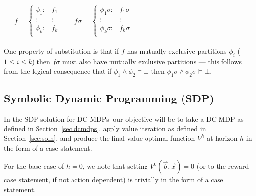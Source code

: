 \documentclass[letterpaper]{article}
\begin{document}
{\footnotesize
\begin{center}
\begin{tabular}{r c c l}
&
\hspace{-6mm} 
  $f = \begin{cases}
    \phi_1: & f_1 \\ 
   \vdots&\vdots\\ 
    \phi_k: & f_k \\ 
  \end{cases}$
&

&
\hspace{-2mm}
  $f\sigma = \begin{cases}
    \phi_1\sigma: & f_1\sigma \\ 
   \vdots&\vdots\\ 
    \phi_k\sigma: & f_k\sigma \\ 
  \end{cases}$
\end{tabular}
\end{center}
}
\normalsize

One property of substitution is that
if $f$ has mutually exclusive partitions $\phi_i$ ($1 \leq i \leq k$)
then $f\sigma$ must also have mutually exclusive partitions ---
this follows from the logical consequence that 
if $\phi_1 \land \phi_2 \models \bot$
then $\phi_1\sigma \land \phi_2\sigma \models \bot$.



\subsection{Symbolic Dynamic Programming (SDP)}


In the SDP solution for DC-MDPs, our objective will be to take
a DC-MDP as defined in Section~\ref{sec:dcmdps}, apply value
iteration as defined in Section~\ref{sec:soln}, and produce
the final value optimal function $V^h$ at horizon $h$ in the form
of a case statement.

For the base case of $h=0$, we note that setting $V^0(\vec{b},\vec{x}) = 0$
(or to the reward case statement, if not action dependent)
is trivially in the form of a case statement.  
\end{document}

